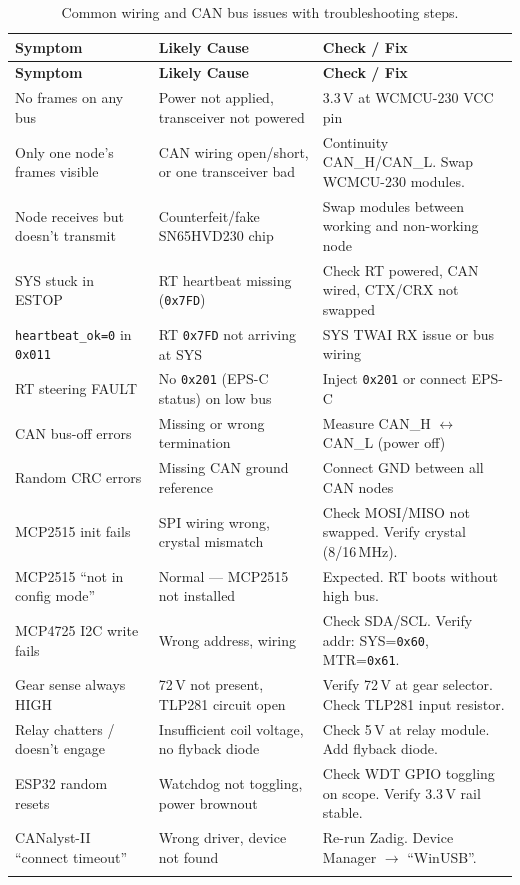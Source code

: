 \documentclass[12pt,a4paper,oneside]{report}
\newcommand{\canid}[1]{\texttt{0x#1}}
\newcommand{\iicaddr}[1]{\texttt{0x#1}}
\begin{document}
\begin{center}
\begin{longtable}{p{52mm} p{40mm} p{52mm}}
\toprule
\textbf{Symptom} & \textbf{Likely Cause} & \textbf{Check / Fix} \\
\midrule
\endfirsthead
\toprule
\textbf{Symptom} & \textbf{Likely Cause} & \textbf{Check / Fix} \\
\midrule
\endhead
No frames on any bus & Power not applied, transceiver not powered & 3.3\,V at WCMCU-230 VCC pin \\
Only one node's frames visible & CAN wiring open/short, or one transceiver bad & Continuity CAN\_H/CAN\_L. Swap WCMCU-230 modules. \\
Node receives but doesn't transmit & Counterfeit/fake SN65HVD230 chip & Swap modules between working and non-working node \\
SYS stuck in ESTOP & RT heartbeat missing (\canid{7FD}) & Check RT powered, CAN wired, CTX/CRX not swapped \\
\texttt{heartbeat\_ok=0} in \canid{011} & RT \canid{7FD} not arriving at SYS & SYS TWAI RX issue or bus wiring \\
RT steering FAULT & No \canid{201} (EPS-C status) on low bus & Inject \canid{201} or connect EPS-C \\
CAN bus-off errors & Missing or wrong termination & Measure CAN\_H $\leftrightarrow$ CAN\_L (power off) \\
Random CRC errors & Missing CAN ground reference & Connect GND between all CAN nodes \\
MCP2515 init fails & SPI wiring wrong, crystal mismatch & Check MOSI/MISO not swapped. Verify crystal (8/16\,MHz). \\
MCP2515 ``not in config mode'' & Normal --- MCP2515 not installed & Expected. RT boots without high bus. \\
MCP4725 I2C write fails & Wrong address, wiring & Check SDA/SCL. Verify addr: SYS=\iicaddr{60}, MTR=\iicaddr{61}. \\
Gear sense always HIGH & 72\,V not present, TLP281 circuit open & Verify 72\,V at gear selector. Check TLP281 input resistor. \\
Relay chatters / doesn't engage & Insufficient coil voltage, no flyback diode & Check 5\,V at relay module. Add flyback diode. \\
ESP32 random resets & Watchdog not toggling, power brownout & Check WDT GPIO toggling on scope. Verify 3.3\,V rail stable. \\
CANalyst-II ``connect timeout'' & Wrong driver, device not found & Re-run Zadig. Device Manager $\rightarrow$ ``WinUSB''. \\
\bottomrule
\caption{Common wiring and CAN bus issues with troubleshooting steps.}
\end{longtable}
\end{center}
\end{document}
